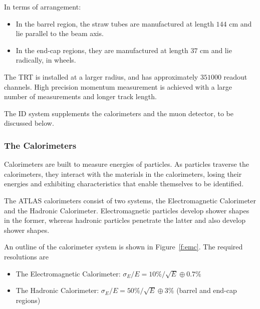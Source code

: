 In terms of arrangement:

\begin{itemize}

	\item In the barrel region, the straw tubes are manufactured at length $144$ cm
	      and lie parallel to the beam axis.

	\item In the end-cap regions, they are manufactured at length $37$ cm and lie
	      radically, in wheels.

\end{itemize}

The TRT is installed at a larger radius, and has approximately $351000$ readout
channels. High precision momentum measurement is achieved with a large number
of measurements and longer track length.

\vspace{5mm}


The ID system supplements the calorimeters and the muon detector, to be
discussed below.

\subsubsection{The Calorimeters}

Calorimeters are built to measure energies of particles. As particles traverse
the calorimeters, they interact with the materials in the calorimeters, losing
their energies and exhibiting characteristics that enable themselves to be
identified.

The ATLAS calorimeters \cite{lhcaccexp, atlasdreport} consist of two systems,
the Electromagnetic Calorimeter and the Hadronic Calorimeter. Electromagnetic
particles develop shower shapes in the former, whereas hadronic particles
penetrate the latter and also develop shower shapes.

An outline of the calorimeter system is shown in Figure~\ref{f:emc}. The
required resolutions are

\begin{itemize}

	\item The Electromagnetic Calorimeter: $\sigma_E / E = 10\% /\sqrt{E} \oplus
		      0.7\%$

	\item The Hadronic Calorimeter: $\sigma_E / E = 50\% /\sqrt{E} \oplus 3\%$
	      (barrel and end-cap regions)

\end{itemize}

